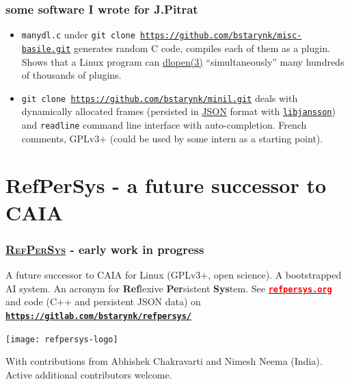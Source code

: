 \documentclass[xcolor=svgnames,final,smaller,a4]{beamer}
\newcommand{\RefPerSys}{\href{http://refpersys.org}{\textsc{RefPerSys}}}
\begin{document}
 \begin{frame}
   \frametitle{some software I wrote for J.Pitrat}

   \begin{itemize}
     \item \texttt{manydl.c} under \texttt{git clone
       \href{https://github.com/bstarynk/misc-basile.git}{https://github.com/bstarynk/misc-basile.git}}
       generates random C code, compiles each of them as a
       plugin. Shows that a Linux program can
       \href{http://man7.org/linux/man-pages/man3/dlopen.3.html}{dlopen(3)}
       ``simultaneously'' many hundreds of thousands of plugins.

    \item\texttt{git clone
      \href{https://github.com/bstarynk/minil.git}{https://github.com/bstarynk/minil.git}}
      deals with dynamically allocated frames (persisted in
      \href{http://json.org}{JSON} format with
      \href{http://www.digip.org/jansson/}{\texttt{libjansson}}) and
      \texttt{readline} command line interface with
      auto-completion. French comments, GPLv3+ (could be used by some
      intern as a starting point).
      
   \end{itemize}
 \end{frame}


   \section{RefPerSys - a future successor to CAIA}
   \label{sec:refpersys}

  \begin{frame}
     \frametitle{{\RefPerSys} - early work in progress}

     A future successor to CAIA for Linux (GPLv3+, open science). A
     bootstrapped AI system. An acronym for \textbf{Ref}lexive
     \textbf{Per}sistent \textbf{Sys}tem. See
     \href{http://refpersys.org/}{\large\texttt{\textbf{\textcolor{red}{refpersys.org}}}}
     and code (C++ and persistent JSON data) on
     \href{https://gitlab.com/bstarynk/refpersys/}{\texttt{\textbf{https://gitlab.com/bstarynk/refpersys/}}}

     \begin{center}
       \texttt{[image: refpersys-logo]} \\
     \end{center}
     
     With contributions from Abhishek Chakravarti and Nimesh Neema (India). Active additional contributors welcome.
     
 \end{frame}
 
  
\end{document}
